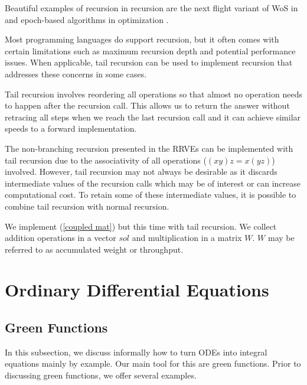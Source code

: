 \documentclass[a4paper,12pt]{article}
\begin{document}
\begin{related}
    Beautiful examples of recursion in recursion are
    the next flight variant of WoS in
    \cite{sawhney_grid-free_2022} and epoch-based algorithms in optimization
    \cite{gupta_convergence_2021}.
\end{related}

Most programming languages do support recursion, but it often comes with certain
limitations such as maximum recursion depth and potential performance issues.
When applicable, tail recursion can be used to
implement recursion that addresses these concerns in some cases.

\begin{technique}
    Tail recursion involves reordering all operations
    so that almost no operation needs to happen after
    the recursion call. This allows us to return the
    answer without retracing all steps when we reach
    the last recursion call and it can achieve similar
    speeds to a forward implementation.
\end{technique}

The non-branching recursion presented in the RRVEs
can be implemented with tail recursion due to the associativity of
all operations ($(xy)z = x(yz)$) involved. However, tail recursion
may not always be desirable as it discards intermediate values of
the recursion calls which may be of interest or can increase
computational cost. To retain some of these intermediate
values, it is possible to combine tail recursion with normal recursion.

\begin{pythonn}
    We implement (\ref{coupled mat}) but this time with tail recursion.
    We collect addition operations in a vector $sol$ and multiplication
    in a matrix $W$. $W$ may be referred to as accumulated weight or throughput.
    \vspace{0.3cm}
\end{pythonn}

\section{Ordinary Differential Equations}

\subsection{Green Functions}
In this subsection, we discuss informally how to turn ODEs into integral equations mainly
by example. Our main tool for this are green functions.
Prior to discussing green functions, we offer several
examples.
\end{document}
